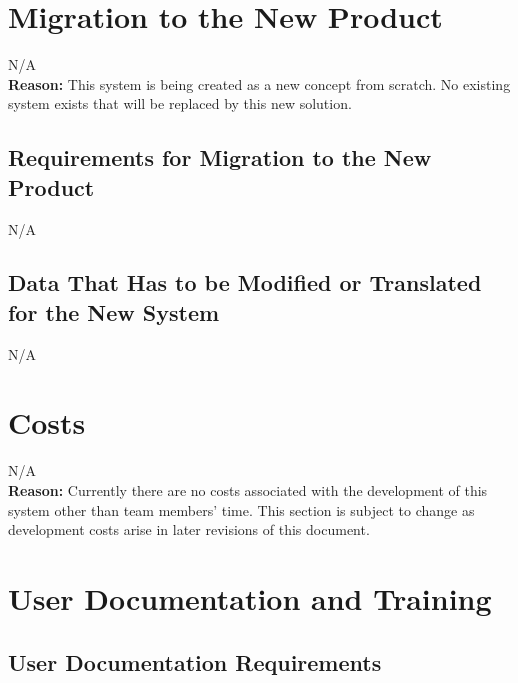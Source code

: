 \documentclass[12pt]{article}
\begin{document}
\section{Migration to the New Product}
\noindent N/A \\
\textbf{Reason:} This system is being created as a new concept from scratch. No existing system exists that will be replaced by this new solution. \\

\subsection{Requirements for Migration to the New Product}
\noindent N/A

\subsection{Data That Has to be Modified or Translated for the New System}
\noindent N/A


\section{Costs}
\noindent N/A \\
\textbf{Reason:} Currently there are no costs associated with the development of this system other than team members' time. This section is subject to change as development costs arise in later revisions of this document. \\


\section{User Documentation and Training}
\subsection{User Documentation Requirements}
\end{document}
